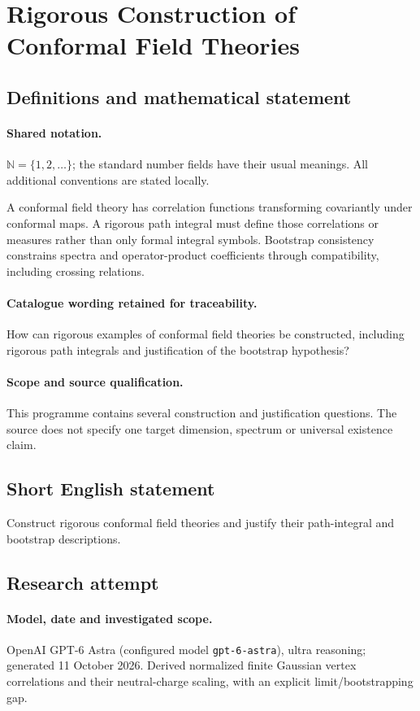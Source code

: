 \documentclass[11pt]{article}
\begin{document}
\section{Rigorous Construction of Conformal Field Theories}\label{statement}

\subsection{Definitions and mathematical statement}

\paragraph{Shared notation.}$\mathbb N=\{1,2,\ldots\}$; the standard number fields have their usual meanings. All additional conventions are stated locally.


A conformal field theory has correlation functions transforming covariantly under conformal maps. A rigorous path integral must define those correlations or measures rather than only formal integral symbols. Bootstrap consistency constrains spectra and operator-product coefficients through compatibility, including crossing relations.

\paragraph{Catalogue wording retained for traceability.}
How can rigorous examples of conformal field theories be constructed, including rigorous path integrals and justification of the bootstrap hypothesis?

\paragraph{Scope and source qualification.}This programme contains several construction and justification questions. The source does not specify one target dimension, spectrum or universal existence claim.
\subsection{Short English statement}
Construct rigorous conformal field theories and justify their path-integral and bootstrap descriptions.
\subsection{Research attempt}
\paragraph{Model, date and investigated scope.}
OpenAI GPT-6 Astra (configured model \texttt{gpt-6-astra}), ultra reasoning; generated 11 October 2026. Derived normalized finite Gaussian vertex correlations and their neutral-charge scaling, with an explicit limit/bootstrapping gap.
\end{document}
